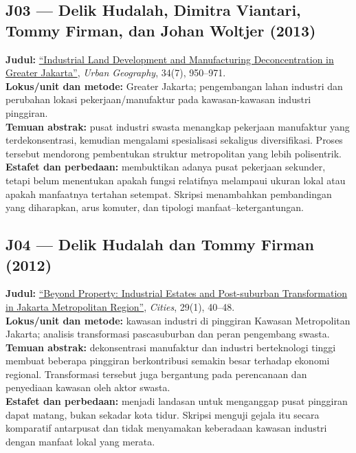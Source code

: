 \documentclass[
  indonesian,
  11pt,
  a4paper,
  oneside,
  openany]{report}
\begin{document}
\subsection{J03 --- Delik Hudalah, Dimitra Viantari, Tommy Firman, dan
Johan Woltjer
(2013)}\label{j03-delik-hudalah-dimitra-viantari-tommy-firman-dan-johan-woltjer-2013}

\textbf{Judul:}
\href{https://doi.org/10.1080/02723638.2013.783281}{``Industrial Land
Development and Manufacturing Deconcentration in Greater Jakarta''},
\emph{Urban Geography}, 34(7), 950--971.\\
\textbf{Lokus/unit dan metode:} Greater Jakarta; pengembangan lahan
industri dan perubahan lokasi pekerjaan/manufaktur pada kawasan-kawasan
industri pinggiran.\\
\textbf{Temuan abstrak:} pusat industri swasta menangkap pekerjaan
manufaktur yang terdekonsentrasi, kemudian mengalami spesialisasi
sekaligus diversifikasi. Proses tersebut mendorong pembentukan struktur
metropolitan yang lebih polisentrik.\\
\textbf{Estafet dan perbedaan:} membuktikan adanya pusat pekerjaan
sekunder, tetapi belum menentukan apakah fungsi relatifnya melampaui
ukuran lokal atau apakah manfaatnya tertahan setempat. Skripsi
menambahkan pembandingan yang diharapkan, arus komuter, dan tipologi
manfaat--ketergantungan.

\subsection{J04 --- Delik Hudalah dan Tommy Firman
(2012)}\label{j04-delik-hudalah-dan-tommy-firman-2012}

\textbf{Judul:}
\href{https://doi.org/10.1016/j.cities.2011.07.003}{``Beyond Property:
Industrial Estates and Post-suburban Transformation in Jakarta
Metropolitan Region''}, \emph{Cities}, 29(1), 40--48.\\
\textbf{Lokus/unit dan metode:} kawasan industri di pinggiran Kawasan
Metropolitan Jakarta; analisis transformasi pascasuburban dan peran
pengembang swasta.\\
\textbf{Temuan abstrak:} dekonsentrasi manufaktur dan industri
berteknologi tinggi membuat beberapa pinggiran berkontribusi semakin
besar terhadap ekonomi regional. Transformasi tersebut juga bergantung
pada perencanaan dan penyediaan kawasan oleh aktor swasta.\\
\textbf{Estafet dan perbedaan:} menjadi landasan untuk menganggap pusat
pinggiran dapat matang, bukan sekadar kota tidur. Skripsi menguji gejala
itu secara komparatif antarpusat dan tidak menyamakan keberadaan kawasan
industri dengan manfaat lokal yang merata.
\end{document}
